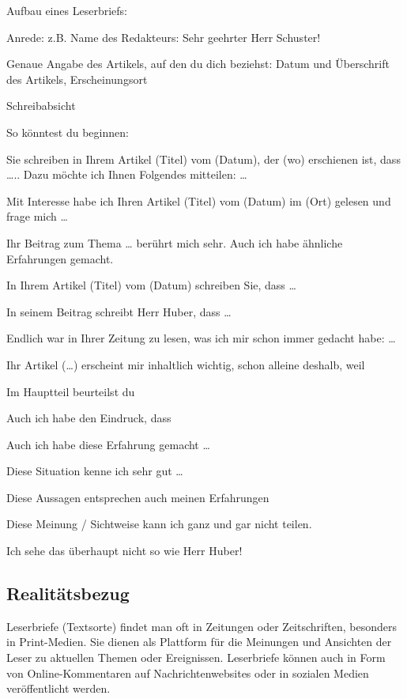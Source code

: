 Aufbau eines Leserbriefs: 
\begin{compactitem}
    
    \item Anrede: z.B. Name des Redakteurs: Sehr geehrter Herr Schuster! 
    \item Genaue Angabe des Artikels, auf den du dich beziehst: Datum und Überschrift des Artikels, Erscheinungsort 
    \item Schreibabsicht 
\end{compactitem}
So könntest du beginnen: 
\begin{compactitem}
    \item Sie schreiben in Ihrem Artikel (Titel) vom (Datum), der (wo) erschienen ist, dass ….. Dazu möchte ich Ihnen Folgendes mitteilen: … 
    \item Mit Interesse habe ich Ihren Artikel (Titel) vom (Datum) im (Ort) gelesen und frage mich … 
    \item Ihr Beitrag zum Thema … berührt mich sehr. Auch ich habe ähnliche Erfahrungen gemacht. 
    \item In Ihrem Artikel (Titel) vom (Datum) schreiben Sie, dass … 
    \item In seinem Beitrag schreibt Herr Huber, dass … 
    \item Endlich war in Ihrer Zeitung zu lesen, was ich mir schon immer gedacht habe: … 
    \item Ihr Artikel (…) erscheint mir inhaltlich wichtig, schon alleine deshalb, weil 
\end{compactitem}
Im Hauptteil beurteilst du 
\begin{compactitem}
    \item Auch ich habe den Eindruck, dass 
    \item Auch ich habe diese Erfahrung gemacht … 
    \item  Diese Situation kenne ich sehr gut … 
    \item Diese Aussagen entsprechen auch meinen Erfahrungen 
    \item Diese Meinung / Sichtweise kann ich ganz und gar nicht teilen.  
    \item Ich sehe das überhaupt nicht so wie Herr Huber! 
\end{compactitem}
\subsection{Realitätsbezug}
Leserbriefe (Textsorte) findet man oft in Zeitungen oder Zeitschriften, besonders in Print-Medien. Sie dienen als Plattform für die Meinungen und Ansichten der Leser zu aktuellen Themen oder Ereignissen. Leserbriefe können auch in Form von Online-Kommentaren auf Nachrichtenwebsites oder in sozialen Medien veröffentlicht werden. 

